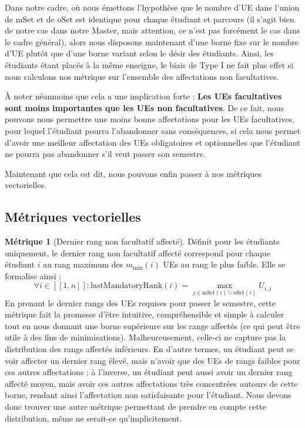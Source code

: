 \documentclass{rapport}
\theoremstyle{definition}
\theoremstyle{remark}
\theoremstyle{plain}
\theoremstyle{definition}
\newtheorem*{metric}{Métrique}
\theoremstyle{remark}
\newcommand{\llbracket}{[\![}
\newcommand{\rrbracket}{]\!]}
\begin{document}
Dans notre cadre, où nous émettons l'hypothèse que le nombre d'UE dans l'union de $\text{mSet}$ et de $\text{oSet}$ est identique pour chaque étudiant et parcours (il s'agit bien de notre cas dans notre Master, mais attention, ce n'est pas forcément le cas dans le cadre général), alors nous disposons maintenant d'une borne fixe sur le nombre d'UE plutôt que d'une borne variant selon le désir des étudiants. 
Ainsi, les étudiants étant placés à la même enseigne, le biais de Type I ne fait plus effet si nous calculons nos métrique sur l'ensemble des affectations non facultatives.

À noter néanmoins que cela a une implication forte : \textbf{Les UEs facultatives sont moins importantes que les UEs non facultatives}. 
De ce fait, nous pouvons nous permettre une moins bonne affectations pour les UEs facultatives, pour lequel l'étudiant pourra l'abandonner sans conséquences, si cela nous permet d'avoir une meilleur affectation des UEs obligatoires et optionnelles que l'étudiant ne pourra pas abandonner s'il veut passer son semestre.

Maintenant que cela est dit, nous pouvons enfin passer à nos métriques vectorielles.

\subsection{Métriques vectorielles}
\begin{metric}[Dernier rang non facultatif affecté]
    Définit pour les étudiants uniquement, le dernier rang non facultatif affecté correspond pour chaque étudiant $i$ au rang maximum des $m_{\min}(i)$ UEs au rang le plus faible.
    Elle se formalise ainsi :
    $$
        \forall i\in\llbracket 1, n\rrbracket : \text{lastMandatoryRank}(i) = \max_{j\in \text{mSet}(i)\cup\text{oSet}(i)} U_{i,j}  
    $$
    En prenant le dernier rangs des UEs requises pour passer le semestre, cette métrique fait la promesse d'être intuitive, compréhensible et simple à calculer tout en nous donnant une borne supérieure sur les rangs affectés (ce qui peut être utile à des fins de minimisations). 
    Malheureusement, celle-ci ne capture pas la distribution des rangs affectés inférieurs. 
    En d'autre termes, un étudiant peut se voir affecter un dernier rang élevé, mais n'avoir que des UEs de rangs faibles pour ces autres affectations ; à l'inverse, un étudiant peut aussi avoir un dernier rang affecté moyen, mais avoir ces autres affectations très concentrées autours de cette borne, rendant ainsi l'affectation non satisfaisante pour l'étudiant. 
    Nous devons donc trouver une autre métrique permettant de prendre en compte cette distribution, même ne serait-ce qu'implicitement. 
\end{metric}
\end{document}
